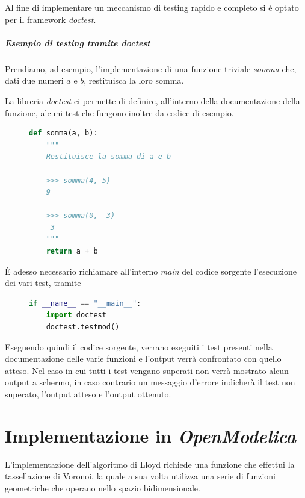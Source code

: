 \documentclass[11pt,a4paper]{report}
\begin{document}
Al fine di implementare un meccanismo di testing rapido e completo si è optato per il framework \textit{doctest}.

\paragraph{Esempio di testing tramite \textit{doctest}}

Prendiamo, ad esempio, l'implementazione di una funzione triviale \textit{somma} che, dati due numeri $a$ e $b$, restituisca la loro somma.

La libreria \textit{doctest} ci permette di definire, all'interno della documentazione della funzione, alcuni test che fungono inoltre da codice di esempio.

\begin{figure}[H]
\begin{lstlisting}[language=Python]
def somma(a, b):
	"""
	Restituisce la somma di a e b
	
	>>> somma(4, 5)
	9
	
	>>> somma(0, -3)
	-3
	"""
	return a + b
\end{lstlisting}
\end{figure}

È adesso necessario richiamare all'interno \textit{main} del codice sorgente l'esecuzione dei vari test, tramite

\begin{figure}[H]
\begin{lstlisting}[language=Python]
if __name__ == "__main__":
    import doctest
    doctest.testmod()
\end{lstlisting}
\end{figure}

Eseguendo quindi il codice sorgente, verrano eseguiti i test presenti nella documentazione delle varie funzioni e l'output verrà confrontato con quello atteso. Nel caso in cui tutti i test vengano superati non verrà mostrato alcun output a schermo, in caso contrario un messaggio d'errore indicherà il test non superato, l'output atteso e l'output ottenuto.

\chapter{Implementazione in \textit{OpenModelica}}

L'implementazione dell'algoritmo di Lloyd richiede una funzione che effettui la tassellazione di Voronoi, la quale a sua volta utilizza una serie di funzioni geometriche che operano nello spazio bidimensionale.
\end{document}
